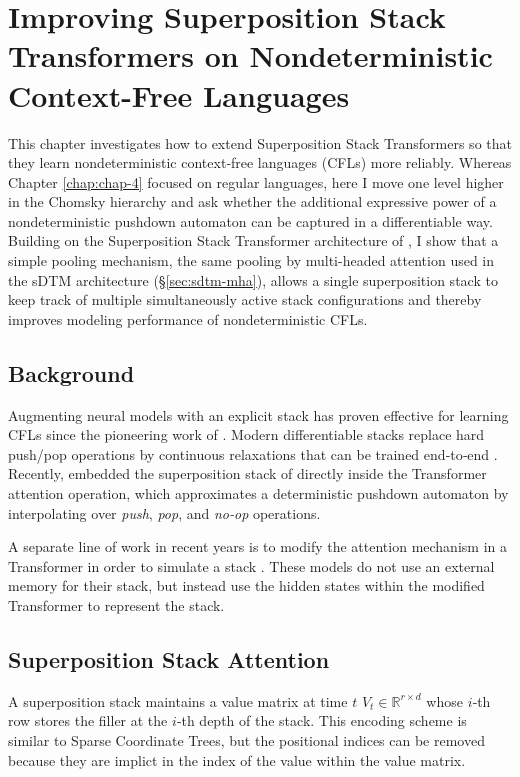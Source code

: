 \chapter{Improving Superposition Stack Transformers on Nondeterministic Context-Free Languages} \label{chap:chap-5}


This chapter investigates how to extend Superposition Stack Transformers \citep{dusell2024stack} so that they learn nondeterministic context‑free languages (CFLs) more reliably.  Whereas Chapter \ref{chap:chap-4} focused on regular languages, here I move one level higher in the Chomsky hierarchy and ask whether the additional expressive power of a nondeterministic pushdown automaton can be captured in a differentiable way.  Building on the Superposition Stack Transformer architecture of \citet{dusell2024stack}, I show that a simple pooling mechanism, the same pooling by multi-headed attention used in the sDTM architecture (\S\ref{sec:sdtm-mha}), allows a single superposition stack to keep track of multiple simultaneously active stack configurations and thereby improves modeling performance of nondeterministic CFLs.

\section{Background}
Augmenting neural models with an explicit stack has proven effective for learning CFLs since the pioneering work of \citet{das1992learning}.  Modern differentiable stacks replace hard push/pop operations by continuous relaxations that can be trained end‑to‑end \citep{joulin2015inferring, grefenstette2015learning}.  Recently, \citet{dusell2024stack} embedded the superposition stack of \citet{joulin2015inferring} directly inside the Transformer attention operation, which approximates a deterministic pushdown automaton by interpolating over \textit{push}, \textit{pop}, and \textit{no‑op} operations.

A separate line of work in recent years is to modify the attention mechanism in a Transformer in order to simulate a stack \citep{murty_pushdown_2023, li_transformer_2024}. These models do not use an external memory for their stack, but instead use the hidden states within the modified Transformer to represent the stack.

\section{Superposition Stack Attention}
A superposition stack maintains a value matrix at time $t$ $V_t \in \mathbb{R}^{r\times d}$ whose $i$‑th row stores the filler at the $i$‑th depth of the stack. This encoding scheme is similar to Sparse Coordinate Trees, but the positional indices can be removed because they are implict in the index of the value within the value matrix.


